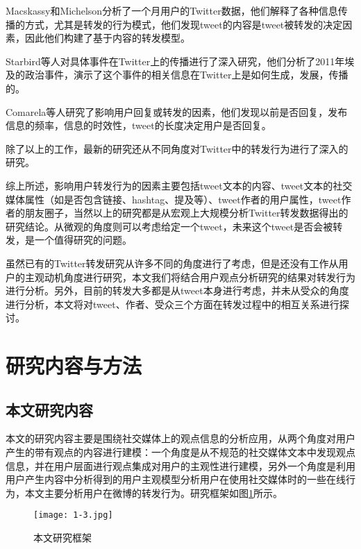Macskassy和Michelson分析了一个月用户的Twitter数据，他们解释了各种信息传播的方式，尤其是转发的行为模式，他们发现tweet的内容是tweet被转发的决定因素，因此他们构建了基于内容的转发模型。

Starbird等人对具体事件在Twitter上的传播进行了深入研究，他们分析了2011年埃及的政治事件，演示了这个事件的相关信息在Twitter上是如何生成，发展，传播的。

Comarela等人研究了影响用户回复或转发的因素，他们发现以前是否回复，发布信息的频率，信息的时效性，tweet的长度决定用户是否回复。

除了以上的工作，最新的研究还从不同角度对Twitter中的转发行为进行了深入的研究。

综上所述，影响用户转发行为的因素主要包括tweet文本的内容、tweet文本的社交媒体属性（如是否包含链接、hashtag、提及等）、tweet作者的用户属性，tweet作者的朋友圈子，当然以上的研究都是从宏观上大规模分析Twitter转发数据得出的研究结论。从微观的角度则可以考虑给定一个tweet，未来这个tweet是否会被转发，是一个值得研究的问题。

虽然已有的Twitter转发研究从许多不同的角度进行了考虑，但是还没有工作从用户的主观动机角度进行研究，本文我们将结合用户观点分析研究的结果对转发行为进行分析。另外，目前的转发大多都是从tweet本身进行考虑，并未从受众的角度进行分析，本文将对tweet、作者、受众三个方面在转发过程中的相互关系进行探讨。

\section{研究内容与方法}

\subsection{本文研究内容}
本文的研究内容主要是围绕社交媒体上的观点信息的分析应用，从两个角度对用户产生的带有观点的内容进行建模：一个角度是从不规范的社交媒体文本中发现观点信息，并在用户层面进行观点集成对用户的主观性进行建模，另外一个角度是利用用户产生内容中分析得到的用户主观模型分析用户在使用社交媒体时的一些在线行为，本文主要分析用户在微博的转发行为。研究框架如图\ref{fig1-3}所示。

\begin{figure}[htp]
\centering
\texttt{[image: 1-3.jpg]}
\caption{本文研究框架}
\label{fig1-3}
\end{figure}

